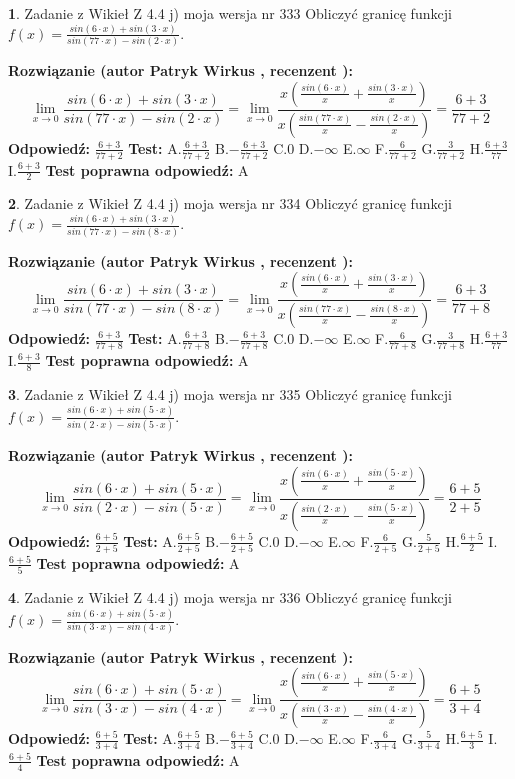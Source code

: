 \documentclass[12pt, a4paper]{article}
\theoremstyle{definition} %
\newtheorem{zad}{}
\newcommand{\zadStart}[1]{\begin{zad}#1\newline}
\newcommand{\zadStop}{\end{zad}}
\newcommand{\rozwStart}[2]{\noindent \textbf{Rozwiązanie (autor #1 , recenzent #2): }\newline}
\newcommand{\rozwStop}{\newline}
\newcommand{\odpStart}{\noindent \textbf{Odpowiedź:}\newline}
\newcommand{\odpStop}{\newline}
\newcommand{\testStart}{\noindent \textbf{Test:}\newline}
\newcommand{\testStop}{\newline}
\newcommand{\kluczStart}{\noindent \textbf{Test poprawna odpowiedź:}\newline}
\newcommand{\kluczStop}{\newline}
\begin{document}
\zadStart{Zadanie z Wikieł Z 4.4 j) moja wersja nr 333}
Obliczyć granicę funkcji $f(x)=\frac{sin(6\cdot x) +sin(3\cdot x)}{sin(77\cdot x) -sin(2\cdot x)}$.
\zadStop
\rozwStart{Patryk Wirkus}{}
$$\lim\limits_{x\to 0}\frac{sin(6\cdot x) +sin(3\cdot x)}{sin(77\cdot x) -sin(2\cdot x)}=\lim\limits_{x\to 0}\frac{x(\frac{sin(6\cdot x)}{x}+\frac{sin(3\cdot x)}{x})}{x(\frac{sin(77\cdot x)}{x}-\frac{sin(2\cdot x)}{x})}=\frac{6+3}{77+2}$$
\rozwStop
\odpStart
$\frac{6+3}{77+2}$
\odpStop
\testStart
A.$\frac{6+3}{77+2}$
B.$-\frac{6+3}{77+2}$
C.$0$
D.$-\infty$
E.$\infty$
F.$\frac{6}{77+2}$
G.$\frac{3}{77+2}$
H.$\frac{6+3}{77}$
I.$\frac{6+3}{2}$
\testStop
\kluczStart
A
\kluczStop



\zadStart{Zadanie z Wikieł Z 4.4 j) moja wersja nr 334}
Obliczyć granicę funkcji $f(x)=\frac{sin(6\cdot x) +sin(3\cdot x)}{sin(77\cdot x) -sin(8\cdot x)}$.
\zadStop
\rozwStart{Patryk Wirkus}{}
$$\lim\limits_{x\to 0}\frac{sin(6\cdot x) +sin(3\cdot x)}{sin(77\cdot x) -sin(8\cdot x)}=\lim\limits_{x\to 0}\frac{x(\frac{sin(6\cdot x)}{x}+\frac{sin(3\cdot x)}{x})}{x(\frac{sin(77\cdot x)}{x}-\frac{sin(8\cdot x)}{x})}=\frac{6+3}{77+8}$$
\rozwStop
\odpStart
$\frac{6+3}{77+8}$
\odpStop
\testStart
A.$\frac{6+3}{77+8}$
B.$-\frac{6+3}{77+8}$
C.$0$
D.$-\infty$
E.$\infty$
F.$\frac{6}{77+8}$
G.$\frac{3}{77+8}$
H.$\frac{6+3}{77}$
I.$\frac{6+3}{8}$
\testStop
\kluczStart
A
\kluczStop



\zadStart{Zadanie z Wikieł Z 4.4 j) moja wersja nr 335}
Obliczyć granicę funkcji $f(x)=\frac{sin(6\cdot x) +sin(5\cdot x)}{sin(2\cdot x) -sin(5\cdot x)}$.
\zadStop
\rozwStart{Patryk Wirkus}{}
$$\lim\limits_{x\to 0}\frac{sin(6\cdot x) +sin(5\cdot x)}{sin(2\cdot x) -sin(5\cdot x)}=\lim\limits_{x\to 0}\frac{x(\frac{sin(6\cdot x)}{x}+\frac{sin(5\cdot x)}{x})}{x(\frac{sin(2\cdot x)}{x}-\frac{sin(5\cdot x)}{x})}=\frac{6+5}{2+5}$$
\rozwStop
\odpStart
$\frac{6+5}{2+5}$
\odpStop
\testStart
A.$\frac{6+5}{2+5}$
B.$-\frac{6+5}{2+5}$
C.$0$
D.$-\infty$
E.$\infty$
F.$\frac{6}{2+5}$
G.$\frac{5}{2+5}$
H.$\frac{6+5}{2}$
I.$\frac{6+5}{5}$
\testStop
\kluczStart
A
\kluczStop



\zadStart{Zadanie z Wikieł Z 4.4 j) moja wersja nr 336}
Obliczyć granicę funkcji $f(x)=\frac{sin(6\cdot x) +sin(5\cdot x)}{sin(3\cdot x) -sin(4\cdot x)}$.
\zadStop
\rozwStart{Patryk Wirkus}{}
$$\lim\limits_{x\to 0}\frac{sin(6\cdot x) +sin(5\cdot x)}{sin(3\cdot x) -sin(4\cdot x)}=\lim\limits_{x\to 0}\frac{x(\frac{sin(6\cdot x)}{x}+\frac{sin(5\cdot x)}{x})}{x(\frac{sin(3\cdot x)}{x}-\frac{sin(4\cdot x)}{x})}=\frac{6+5}{3+4}$$
\rozwStop
\odpStart
$\frac{6+5}{3+4}$
\odpStop
\testStart
A.$\frac{6+5}{3+4}$
B.$-\frac{6+5}{3+4}$
C.$0$
D.$-\infty$
E.$\infty$
F.$\frac{6}{3+4}$
G.$\frac{5}{3+4}$
H.$\frac{6+5}{3}$
I.$\frac{6+5}{4}$
\testStop
\kluczStart
A
\kluczStop
\end{document}
